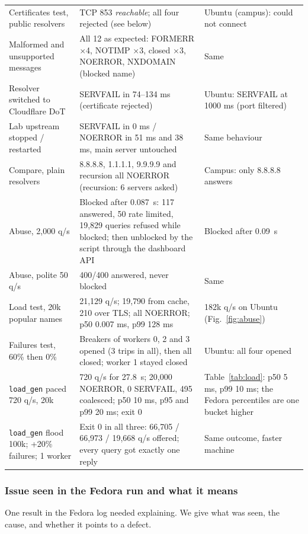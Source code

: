 \documentclass[11pt,a4paper]{article}
\newcommand{\code}[1]{\texttt{#1}}
\begin{document}
{\begin{longtable}{@{}P{4.6cm}P{5.6cm}P{5.0cm}@{}}
Certificates test, public resolvers & TCP 853 \emph{reachable}; all four rejected (see below) & Ubuntu (campus): could not connect \\
Malformed and unsupported messages & All 12 as expected: FORMERR $\times$4, NOTIMP $\times$3, closed $\times$3, NOERROR, NXDOMAIN (blocked name) & Same \\
Resolver switched to Cloudflare DoT & SERVFAIL in 74--134 ms (certificate rejected) & Ubuntu: SERVFAIL at 1000 ms (port filtered) \\
Lab upstream stopped / restarted & SERVFAIL in 0 ms / NOERROR in 51 ms and 38 ms, main server untouched & Same behaviour \\
Compare, plain resolvers & 8.8.8.8, 1.1.1.1, 9.9.9.9 and recursion all NOERROR (recursion: 6 servers asked) & Campus: only 8.8.8.8 answers \\
Abuse, 2{,}000 q/s & Blocked after 0.087~s: 117 answered, 50 rate limited, 19{,}829 queries refused while blocked; then unblocked by the script through the dashboard API & Blocked after 0.09~s \\
Abuse, polite 50 q/s & 400/400 answered, never blocked & Same \\
Load test, 20k popular names & 21{,}129 q/s; 19{,}790 from cache, 210 over TLS; all NOERROR; p50 0.007 ms, p99 128 ms & 182k q/s on Ubuntu (Fig.~\ref{fig:abuse}) \\
Failures test, 60\% then 0\% & Breakers of workers 0, 2 and 3 opened (3 trips in all), then all closed; worker 1 stayed closed & Ubuntu: all four opened \\
\code{load\_gen} paced 720 q/s, 20k & 720 q/s for 27.8~s; 20{,}000 NOERROR, 0 SERVFAIL, 495 coalesced; p50 10 ms, p95 and p99 20 ms; exit 0 & Table~\ref{tab:load}: p50 5 ms, p99 10 ms; the Fedora percentiles are one bucket higher \\
\code{load\_gen} flood 100k; +20\% failures; 1 worker & Exit 0 in all three: 66{,}705 / 66{,}973 / 19{,}668 q/s offered; every query got exactly one reply & Same outcome, faster machine \\
\bottomrule
\end{longtable}
}

\subsubsection*{Issue seen in the Fedora run and what it means}
One result in the Fedora log needed explaining. We give what was seen, the cause, and whether it points to a
defect.
\end{document}
